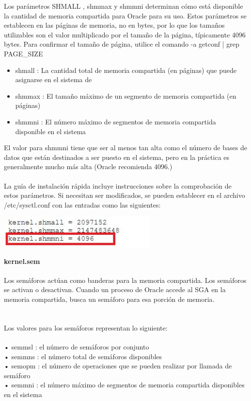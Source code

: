 Los parámetros SHMALL , shmmax y shmmni determinan cómo está disponible la cantidad de memoria compartida para Oracle para su uso. Estos parámetros se establecen en las páginas de memoria, no en bytes, por lo que los tamaños utilizables son el valor multiplicado por el tamaño de la página, típicamente 4096 bytes. Para confirmar el tamaño de página, utilice el comando -a getconf | grep PAGE\_SIZE
\begin{itemize}
	\item shmall : La cantidad total de memoria compartida (en páginas) que puede asignarse en el sistema de
	\item shmmax : El tamaño máximo de un segmento de memoria compartida (en páginas)
	\item shmmni : El número máximo de segmentos de memoria compartida disponible en el sistema
\end{itemize}
El valor para shmmni tiene que ser al menos tan alta como el número de bases de datos que están destinados a ser puesto en el sistema, pero en la práctica es generalmente mucho más alta (Oracle recomienda 4096.) \\ \\
La guía de instalación rápida incluye instrucciones sobre la comprobación de estos parámetros. Si necesitan ser modificados, se pueden establecer en el archivo /etc/sysctl.conf con las entradas como las siguientes:
	\begin{center}
	\includegraphics[width=8cm]{./Imagenes/kernelShimi} 
\end{center}

{\bfseries  kernel.sem}
\\
\\Los semáforos actúan como banderas para la memoria compartida. Los semáforos se activan o desactivan. Cuando un proceso de Oracle accede al SGA en la memoria compartida, busca un semáforo para esa porción de memoria. \\
\\
\\Los valores para los semáforos representan lo siguiente:\\
\\•	semmsl : el número de semáforos por conjunto
\\•	semmns : el número total de semáforos disponibles
\\•	semopm : el número de operaciones que se pueden realizar por llamada de semáforo
\\•	semmni : el número máximo de segmentos de memoria compartida disponibles en el sistema
\\

